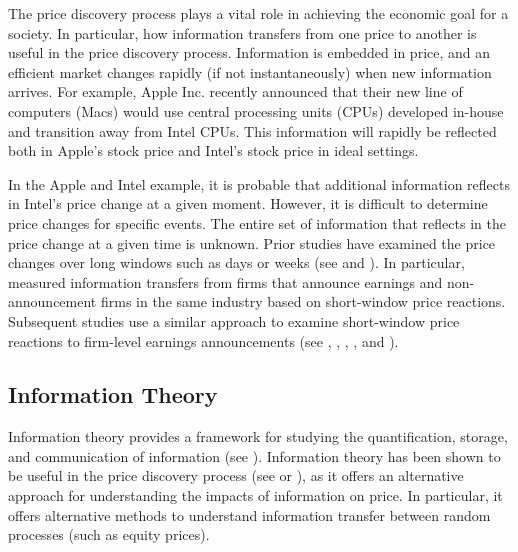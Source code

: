 The price discovery process plays a vital role in achieving the economic goal for a society.   In particular, how information transfers from one price to another is useful in the price discovery process.  Information is embedded in price, and an efficient market changes rapidly (if not instantaneously) when new information arrives.  For example, Apple Inc. recently announced that their new line of computers (Macs) would use central processing units (CPUs) developed in-house and transition away from Intel CPUs.  This information will rapidly be reflected both in Apple's stock price and Intel's stock price in ideal settings.

In the Apple and Intel example, it is probable that additional information reflects in Intel's price change at a given moment. However, it is difficult to determine price changes for specific events. The entire set of information that reflects in the price change at a given time is unknown.  Prior studies have examined the price changes over long windows such as days or weeks (see \cite{Foster1981} and \cite{Baginiski1987}).  In particular, \cite{Foster1981} measured information transfers from firms that announce earnings and non-announcement firms in the same industry based on short-window price reactions.  Subsequent studies use a similar approach to examine short-window price reactions to firm-level earnings announcements (see \cite{ClinchSinclair1987},   \cite{PownallWaymire1989},  \cite{HanWild1990},  \cite{Wang2014},  and \cite{HannKimZheng2019}).   %

\subsection{Information Theory } \label{sec:InformationTheory}
Information theory provides a framework for studying the quantification, storage, and communication of information (see \cite{InfoTheoryApplication}).  Information theory has been  shown to be useful in the price discovery process (see \cite{Billio2012} or \cite{DieboldYilmaz2014}), as it offers an alternative approach for understanding the impacts of information on price.   In particular,  it offers alternative methods to understand information transfer between random processes (such as equity prices).  

